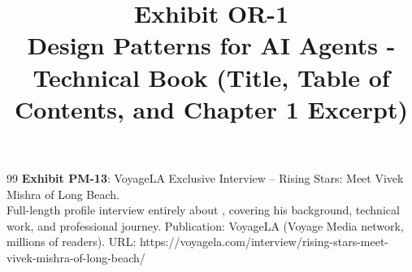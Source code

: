 \documentclass[11pt]{article}
\begin{document}
\begin{thebibliography}{99}
\textbf{Exhibit PM-13}: VoyageLA Exclusive Interview -- Rising Stars: Meet Vivek Mishra of Long Beach.
\\Full-length profile interview entirely about \dr, covering his background, technical work, and professional journey. Publication: VoyageLA (Voyage Media network, millions of readers). URL: https://voyagela.com/interview/rising-stars-meet-vivek-mishra-of-long-beach/



% 
% 


\end{thebibliography}

\pagebreak

\newcommand{\ip}[1]{}
\newcommand{\ex}[2]{
\phantomsection
\hypertarget{exhibit:#1}{}
\title{\textbf{\huge{Exhibit #1}}\\
\vspace{3em}
\Large{#2}
}
\author{}
\maketitle
}


\ex{OR-1}{Design Patterns for AI Agents - Technical Book (Title, Table of Contents, and Chapter 1 Excerpt)}

\end{document}
